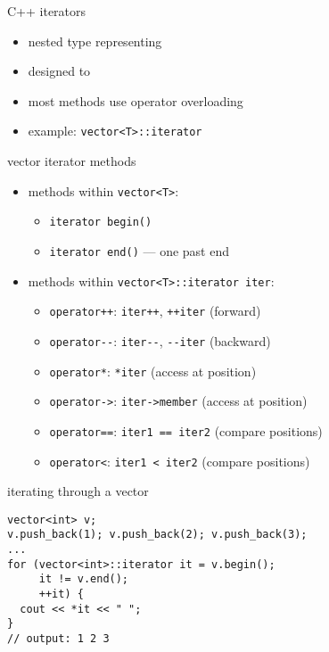 \begin{frame}{C++ iterators}
    \begin{itemize}
        \item nested type representing 
        \item designed to 
        \item most methods use operator overloading
        \item example: \texttt{vector<T>::iterator}
    \end{itemize}
\end{frame}

\begin{frame}[fragile,label=itMethods]{vector iterator methods}
\lstset{
    language=C++,
    style=smaller,
}
\begin{itemize}
\item methods within \lstinline|vector<T>|:
    \begin{itemize}
    \item \lstinline|iterator begin()|
    \item \lstinline|iterator end()| --- one past end
    \end{itemize}
\item methods within \lstinline|vector<T>::iterator iter|:
    \begin{itemize}
        \item \lstinline|operator++|: \lstinline|iter++|, \lstinline|++iter| (forward)
        \item \lstinline|operator--|: \lstinline|iter--|, \lstinline|--iter| (backward)
            \item \lstinline|operator*|: \lstinline|*iter| (access at position)
            \item \lstinline|operator->|: \lstinline|iter->member| (access at position)
            \item \lstinline|operator==|: \lstinline|iter1 == iter2| (compare positions)
            \item \lstinline|operator<|: \lstinline|iter1 < iter2| (compare positions)
    \end{itemize}
\end{itemize}
\end{frame}

\begin{frame}[fragile,label=itInVector]{iterating through a vector}
\lstset{
    language=C++,
    style=small
}
\begin{lstlisting}
vector<int> v;
v.push_back(1); v.push_back(2); v.push_back(3);
...
for (vector<int>::iterator it = v.begin();
     it != v.end();
     ++it) {
  cout << *it << " ";
}
// output: 1 2 3 
\end{lstlisting}
\end{frame}

